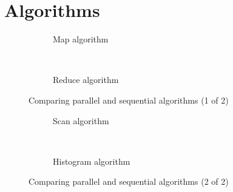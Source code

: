 \chapter{Algorithms}
\label{chap:algorithms}

\begin{figure*}[t]
  \centering
  \begin{subfigure}[b]{.49\linewidth}
    \centering
    \resizebox{!}{.80\textwidth}{
      
    }
    \caption{Map algorithm}
    \label{fig:par seq map}
  \end{subfigure}%
  ~
  \begin{subfigure}[b]{.49\linewidth}
    \centering
    \resizebox{!}{.80\textwidth}{
      
    }
    \caption{Reduce algorithm}
    \label{fig:par seq reduce}
  \end{subfigure}%
  \caption{Comparing parallel and sequential algorithms (1 of 2)}
  \label{fig:par seq 1}
\end{figure*}

\begin{figure*}[t]
  \centering
  \begin{subfigure}[b]{.49\linewidth}
    \centering
    \resizebox{!}{.80\textwidth}{
      
    }
    \caption{Scan algorithm}
    \label{fig:par seq scan}
  \end{subfigure}%
  ~
  \begin{subfigure}[b]{.49\linewidth}
    \centering
    \resizebox{!}{.80\textwidth}{
      
    }
    \caption{Histogram algorithm}
    \label{fig:par seq histogram}
  \end{subfigure}%
  \caption{Comparing parallel and sequential algorithms (2 of 2)}
  \label{fig:par seq 2}
\end{figure*}





